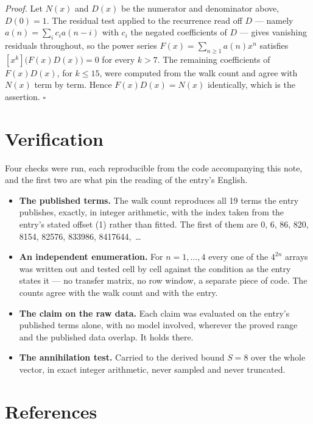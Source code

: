 \documentclass[11pt]{article}
\theoremstyle{definition}
\begin{document}
{\itshape Proof.} Let $N(x)$ and $D(x)$ be the numerator and denominator above, $D(0)=1$. The residual test applied to the recurrence read off $D$ --- namely $a(n) = \sum_i c_i a(n-i)$ with $c_i$ the negated coefficients of $D$ --- gives vanishing residuals throughout, so the power series $F(x)=\sum_{n\ge 1}a(n)x^n$ satisfies $[x^k]\bigl(F(x)D(x)\bigr) = 0$ for every $k > 7$. The remaining coefficients of $F(x)D(x)$, for $k \le 15$, were computed from the walk count and agree with $N(x)$ term by term. Hence $F(x)D(x) = N(x)$ identically, which is the assertion. $\square$

\section{Verification}

Four checks were run, each reproducible from the code accompanying this note, and the first two are what pin the reading of the entry's English.

\begin{itemize}

\item {\bfseries The published terms.} The walk count reproduces all 19 terms the entry publishes, exactly, in integer arithmetic, with the index taken from the entry's stated offset (1) rather than fitted. The first of them are 0, 6, 86, 820, 8154, 82576, 833986, 8417644,~\dots

\item {\bfseries An independent enumeration.} For $n = 1,\dots,4$ every one of the $4^{2n}$ arrays was written out and tested cell by cell against the condition as the entry states it --- no transfer matrix, no row window, a separate piece of code. The counts agree with the walk count and with the entry.

\item {\bfseries The claim on the raw data.} Each claim was evaluated on the entry's published terms alone, with no model involved, wherever the proved range and the published data overlap. It holds there.

\item {\bfseries The annihilation test.} Carried to the derived bound $S = 8$ over the whole vector, in exact integer arithmetic, never sampled and never truncated.

\end{itemize}

\section{References}
\end{document}
